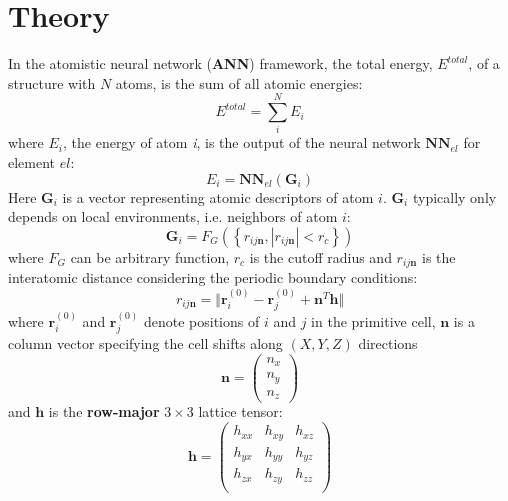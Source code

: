 \documentclass[preprint]{revtex4-2}
\begin{document}
% 
%
\section{Theory}
\label{section:theory}

\newcommand{\rijn}{r_{ij\mathbf{n}}}

In the atomistic neural network (\textbf{ANN}) framework, the total energy, 
$E^{total}$, of a structure with $N$ atoms, is the sum of all atomic energies:
\begin{equation}
\label{eq:general_e_total}
E^{total} = \sum_{i}^{N}{E_i}
\end{equation}
where $E_{i}$, the energy of atom \textit{i}, is the output of the neural 
network $\mathbf{NN}_{el}$ for element $el$:
\begin{equation}
E_i = \mathbf{NN}_{el}\left( \mathbf{G}_i \right)
\end{equation} 
Here $\mathbf{G}_i$ is a vector representing atomic descriptors of atom $i$. 
$\mathbf{G}_i$ typically only depends on local environments, i.e.  
neighbors of atom $i$:
\begin{equation}
\mathbf{G}_i = F_G(\left\{ \rijn, |\rijn| < r_c\right\} )
\end{equation}
where $F_G$ can be arbitrary function, $r_c$ is the cutoff radius and $\rijn$ is 
the interatomic distance considering the periodic boundary conditions: 
\begin{equation}
    \label{eq:rijn}
    \rijn = \Vert \mathbf{r}_i^{(0)} - \mathbf{r}_j^{(0)} + 
    \mathbf{n}^T \mathbf{h} \Vert
\end{equation}
where $\mathbf{r}_i^{(0)}$ and $\mathbf{r}_j^{(0)}$ denote positions of $i$ and 
$j$ in the primitive cell, $\mathbf{n}$ is a column vector specifying the cell 
shifts along $(X,Y,Z)$ directions 
\begin{equation}
    \label{eq:ij_shift}
    \mathbf{n} = \begin{pmatrix}
        n_x \\
        n_y \\
        n_z
    \end{pmatrix}
\end{equation}
and $\mathbf{h}$ is the \textbf{row-major} $3 \times 3$ lattice tensor:
\begin{equation}
    \label{eq:lattice}
    \mathbf{h} = \begin{pmatrix}
        h_{xx} & h_{xy} & h_{xz} \\
        h_{yx} & h_{yy} & h_{yz} \\
        h_{zx} & h_{zy} & h_{zz} \\
    \end{pmatrix}
\end{equation}
\end{document}
